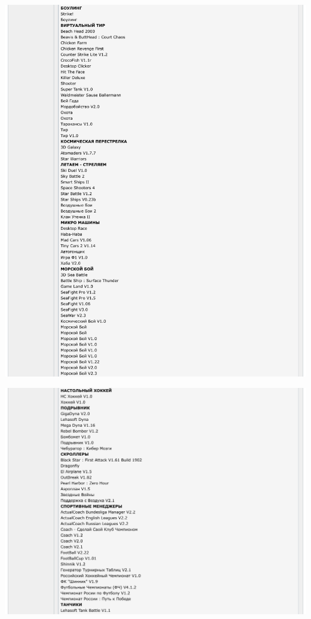 \Continuing
\begin{center}
    \includegraphics[width=41em]{boys-p2}
\end{center}
\WillContinue
\pagebreak

\Continuing
\begin{center}
    \includegraphics[width=41em]{boys-p3}
\end{center}

\pagebreak
